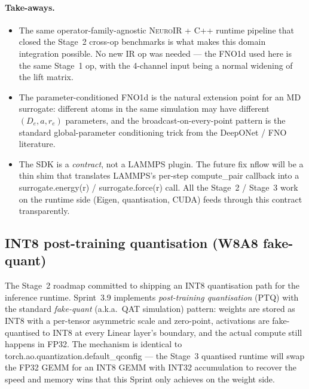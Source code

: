 \documentclass[10pt,twocolumn]{article}
\renewcommand{\texttt}[1]{{\normalfont\ttfamily #1}\normalfont\rmfamily}
\newcommand{\neuroir}{\textsc{NeuroIR}}
\begin{document}
\paragraph{Take-aways.}
\begin{itemize}
\item The same operator-family-agnostic \neuroir{} +
C{++} runtime pipeline that closed the Stage~2
cross-op benchmarks is what makes this domain
integration possible.  No new IR op was needed ---
the FNO1d used here is the same Stage~1 op, with the
4-channel input being a normal widening of the lift
matrix.
\item The parameter-conditioned FNO1d is the natural
extension point for an MD surrogate: different atoms
in the same simulation may have different $(D_e, a,
r_e)$ parameters, and the broadcast-on-every-point
pattern is the standard global-parameter conditioning
trick from the DeepONet / FNO literature.
\item The SDK is a \emph{contract}, not a LAMMPS
plugin.  The future \texttt{fix nflow} will be a thin
shim that translates LAMMPS's per-step
\texttt{compute\_pair} callback into a
\texttt{surrogate.energy(r)} / \texttt{surrogate.force(r)}
call.  All the Stage~2 / Stage~3 work on the runtime
side (Eigen, quantisation, CUDA) feeds through this
contract transparently.
\end{itemize}

\subsection{INT8 post-training quantisation (W8A8 fake-quant)}
\label{sec:int8-quant}

The Stage~2 roadmap committed to shipping an INT8
quantisation path for the inference runtime.  Sprint~3.9
implements \emph{post-training quantisation} (PTQ) with
the standard \emph{fake-quant} (a.k.a.\ QAT simulation)
pattern: weights are stored as INT8 with a per-tensor
asymmetric scale and zero-point, activations are
fake-quantised to INT8 at every Linear layer's boundary,
and the actual compute still happens in FP32.  The
mechanism is identical to
\texttt{torch.ao.quantization.default\_qconfig} --- the
Stage~3 quantised runtime will swap the FP32 GEMM for an
INT8 GEMM with INT32 accumulation to recover the speed
and memory wins that this Sprint only achieves on the
weight side.
\end{document}
